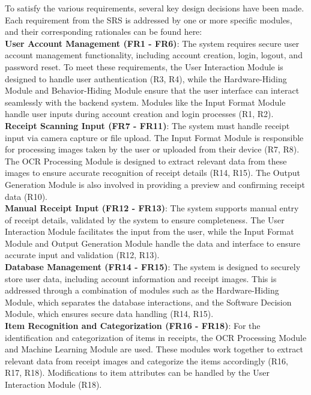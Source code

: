 \documentclass[12pt, titlepage]{article}
\begin{document}
To satisfy the various requirements, several key design decisions have been made. Each requirement from the SRS is addressed by one or more specific modules, and their corresponding rationales can be found here: \\

\noindent \textbf{User Account Management (FR1 - FR6)}:  
The system requires secure user account management functionality, including account creation, login, logout, and password reset. To meet these requirements, the User Interaction Module is designed to handle user authentication (R3, R4), while the Hardware-Hiding Module and Behavior-Hiding Module ensure that the user interface can interact seamlessly with the backend system. Modules like the Input Format Module handle user inputs during account creation and login processes (R1, R2). \\

\noindent \textbf{Receipt Scanning Input (FR7 - FR11)}:  
The system must handle receipt input via camera capture or file upload. The Input Format Module is responsible for processing images taken by the user or uploaded from their device (R7, R8). The OCR Processing Module is designed to extract relevant data from these images to ensure accurate recognition of receipt details (R14, R15). The Output Generation Module is also involved in providing a preview and confirming receipt data (R10). \\

\noindent \textbf{Manual Receipt Input (FR12 - FR13)}:  
The system supports manual entry of receipt details, validated by the system to ensure completeness. The User Interaction Module facilitates the input from the user, while the Input Format Module and Output Generation Module handle the data and interface to ensure accurate input and validation (R12, R13). \\

\noindent \textbf{Database Management (FR14 - FR15)}:  
The system is designed to securely store user data, including account information and receipt images. This is addressed through a combination of modules such as the Hardware-Hiding Module, which separates the database interactions, and the Software Decision Module, which ensures secure data handling (R14, R15). \\

\noindent \textbf{Item Recognition and Categorization (FR16 - FR18)}:  
For the identification and categorization of items in receipts, the OCR Processing Module and Machine Learning Module are used. These modules work together to extract relevant data from receipt images and categorize the items accordingly (R16, R17, R18). Modifications to item attributes can be handled by the User Interaction Module (R18). \\
\end{document}
